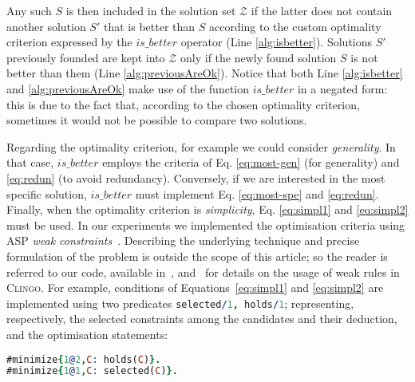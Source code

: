 Any such $S$ is then included in the solution set $\mathcal{Z}$ if the latter does not contain another solution $S'$ that is better than $S$ according to the custom optimality criterion expressed by the ${is\_better}$ operator (Line \ref{alg:isbetter}). Solutions $S'$ previously founded are kept into $\mathcal{Z}$ only if the newly found solution $S$ is not better than them (Line \ref{alg:previousAreOk}). Notice that both Line \ref{alg:isbetter} and \ref{alg:previousAreOk} make use of the function $is\_better$ in a negated form: this is due to the fact that, according to the chosen optimality criterion, sometimes it would not be possible to compare two solutions.

Regarding the optimality criterion, for example we could consider \emph{generality}. In that case, ${is\_better}$ employs the criteria of Eq. \eqref{eq:most-gen} (for generality) and \eqref{eq:redun} (to avoid redundancy). Conversely, if we are interested in the most specific solution, ${is\_better}$ must implement Eq. \eqref{eq:most-spe} and \eqref{eq:redun}.
Finally, when the optimality criterion is \emph{simplicity}, Eq. \eqref{eq:simpl1} and \eqref{eq:simpl2} must be used.
%
In our experiments we implemented the optimisation criteria using ASP \emph{weak constraints}~\cite{ASP:weak:2000}. Describing the underlying technique and precise formulation of the problem is outside the scope of this article; so the reader is referred to our code, available in~\cite{negdis:2021_5158528}, and~\cite{clingo:2019} for details on the usage of weak rules in \textsc{Clingo}. For example, conditions of Equations~\eqref{eq:simpl1} and \eqref{eq:simpl2} are implemented using two predicates \lstinline[language=prolog]$selected/1, holds/1$; representing, respectively, the selected constraints among the candidates and their deduction, and the optimisation statements:
\begin{lstlisting}[language=prolog]
#minimize{1@2,C: holds(C)}.
#minimize{1@1,C: selected(C)}.
\end{lstlisting}


